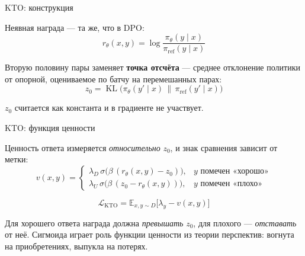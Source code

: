 \documentclass[11pt,aspectratio=169]{beamer}
\newcommand{\aside}[1]{{\color{dim}\small #1}}
\newcommand{\E}{\mathbb{E}}
\newcommand{\KL}{\operatorname{KL}}
\begin{document}
\begin{frame}{KTO: конструкция}

Неявная награда — та же, что в DPO:
\[
r_\theta(x,y) = \log\frac{\pi_\theta(y\mid x)}{\pi_{\text{ref}}(y\mid x)}
\]

Вторую половину пары заменяет \textbf{точка отсчёта} — среднее отклонение
политики от опорной, оцениваемое по батчу на перемешанных парах:
\[
z_0 = \KL\big(\pi_\theta(y'\mid x)\,\|\,\pi_{\text{ref}}(y'\mid x)\big)
\]

\vspace{0.3em}
\aside{$z_0$ считается как константа и в градиенте не участвует.}

\end{frame}

\begin{frame}{KTO: функция ценности}

Ценность ответа измеряется \emph{относительно} $z_0$, и знак сравнения
зависит от метки:
\[
v(x,y) =
\begin{cases}
\lambda_D\,\sigma\big(\beta\,(r_\theta(x,y) - z_0)\big), & y \text{ помечен «хорошо»}\\[0.4em]
\lambda_U\,\sigma\big(\beta\,(z_0 - r_\theta(x,y))\big), & y \text{ помечен «плохо»}
\end{cases}
\]

\vspace{0.5em}
\[
\mathcal{L}_{\text{KTO}} = \E_{x,y\sim D}\big[\lambda_y - v(x,y)\big]
\]

\vspace{0.8em}
Для хорошего ответа награда должна \emph{превышать} $z_0$, для плохого —
\emph{отставать} от неё. Сигмоида играет роль функции ценности из теории
перспектив: вогнута на приобретениях, выпукла на потерях.

\end{frame}
\end{document}

